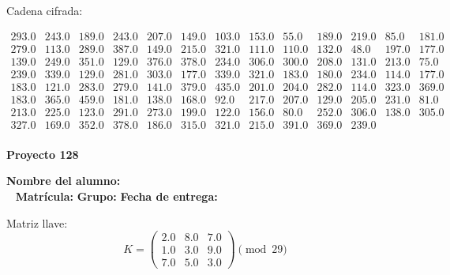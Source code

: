 \documentclass[12pt]{article}
\begin{document}
Cadena cifrada:
\begin{center}
$\begin{array}{lllllllllllll}
293.0 & 243.0 & 189.0 & 243.0 & 207.0 & 149.0 & 103.0 & 153.0 & 55.0 & 189.0 & 219.0 & 85.0 & 181.0\\
279.0 & 113.0 & 289.0 & 387.0 & 149.0 & 215.0 & 321.0 & 111.0 & 110.0 & 132.0 & 48.0 & 197.0 & 177.0\\
139.0 & 249.0 & 351.0 & 129.0 & 376.0 & 378.0 & 234.0 & 306.0 & 300.0 & 208.0 & 131.0 & 213.0 & 75.0\\
239.0 & 339.0 & 129.0 & 281.0 & 303.0 & 177.0 & 339.0 & 321.0 & 183.0 & 180.0 & 234.0 & 114.0 & 177.0\\
183.0 & 121.0 & 283.0 & 279.0 & 141.0 & 379.0 & 435.0 & 201.0 & 204.0 & 282.0 & 114.0 & 323.0 & 369.0\\
183.0 & 365.0 & 459.0 & 181.0 & 138.0 & 168.0 & 92.0 & 217.0 & 207.0 & 129.0 & 205.0 & 231.0 & 81.0\\
213.0 & 225.0 & 123.0 & 291.0 & 273.0 & 199.0 & 122.0 & 156.0 & 80.0 & 252.0 & 306.0 & 138.0 & 305.0\\
327.0 & 169.0 & 352.0 & 378.0 & 186.0 & 315.0 & 321.0 & 215.0 & 391.0 & 369.0 & 239.0\\
\end{array}$
\end{center}

\newpage


\textbf{Proyecto 128}

\textbf{Nombre del alumno:} \underline{\hspace{13cm}}\\\
\vspace{1cm}
\textbf{Matrícula:} \underline{\hspace{4cm}} \hspace{1cm}
\textbf{Grupo:} \underline{\hspace{2cm}}
\textbf{Fecha de entrega:} \underline{\hspace{2cm}}

\medskip

Matriz llave:
\[
K = \begin{pmatrix}
2.0 & 8.0 & 7.0\\
1.0 & 3.0 & 9.0\\
7.0 & 5.0 & 3.0
\end{pmatrix} \pmod{29}
\]
\end{document}
